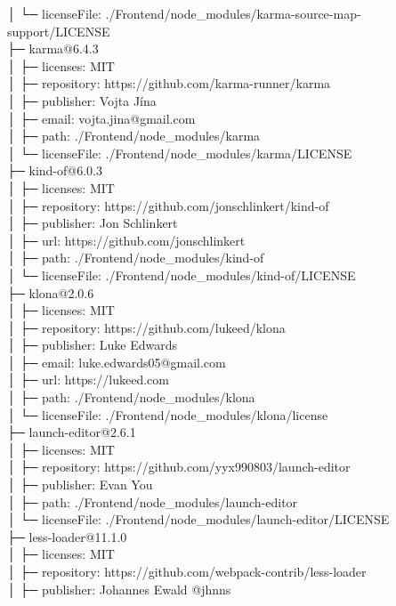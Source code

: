 │  └─ licenseFile: ./Frontend/node\_modules/karma-source-map-support/LICENSE\\
├─ karma@6.4.3\\
│  ├─ licenses: MIT\\
│  ├─ repository: https://github.com/karma-runner/karma\\
│  ├─ publisher: Vojta Jína\\
│  ├─ email: vojta.jina@gmail.com\\
│  ├─ path: ./Frontend/node\_modules/karma\\
│  └─ licenseFile: ./Frontend/node\_modules/karma/LICENSE\\
├─ kind-of@6.0.3\\
│  ├─ licenses: MIT\\
│  ├─ repository: https://github.com/jonschlinkert/kind-of\\
│  ├─ publisher: Jon Schlinkert\\
│  ├─ url: https://github.com/jonschlinkert\\
│  ├─ path: ./Frontend/node\_modules/kind-of\\
│  └─ licenseFile: ./Frontend/node\_modules/kind-of/LICENSE\\
├─ klona@2.0.6\\
│  ├─ licenses: MIT\\
│  ├─ repository: https://github.com/lukeed/klona\\
│  ├─ publisher: Luke Edwards\\
│  ├─ email: luke.edwards05@gmail.com\\
│  ├─ url: https://lukeed.com\\
│  ├─ path: ./Frontend/node\_modules/klona\\
│  └─ licenseFile: ./Frontend/node\_modules/klona/license\\
├─ launch-editor@2.6.1\\
│  ├─ licenses: MIT\\
│  ├─ repository: https://github.com/yyx990803/launch-editor\\
│  ├─ publisher: Evan You\\
│  ├─ path: ./Frontend/node\_modules/launch-editor\\
│  └─ licenseFile: ./Frontend/node\_modules/launch-editor/LICENSE\\
├─ less-loader@11.1.0\\
│  ├─ licenses: MIT\\
│  ├─ repository: https://github.com/webpack-contrib/less-loader\\
│  ├─ publisher: Johannes Ewald @jhnns\\
